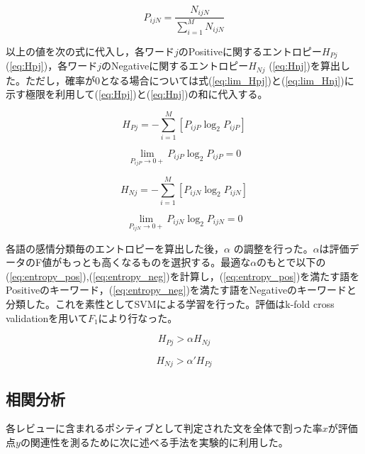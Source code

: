 \documentclass[review]{elsarticle}
\begin{document}
\begin{CJK}{UTF8}{min}
\begin{equation}\label{eq:PijN}
P_{ijN} = \frac{N_{ijN}}{\sum_{i=1}^M N_{ijN}}
\end{equation}

以上の値を次の式に代入し，各ワード\(j\)のPositiveに関するエントロピー\(H_{Pj}\) (\ref{eq:Hpj})，各ワード\(j\)のNegativeに関するエントロピー\(H_{Nj}\) (\ref{eq:Hnj})を算出した。ただし，確率が0となる場合については式(\ref{eq:lim_Hpj})と(\ref{eq:lim_Hnj})に示す極限を利用して(\ref{eq:Hpj})と(\ref{eq:Hnj})の和に代入する。

\begin{equation}\label{eq:Hpj}
H_{Pj} = - \sum_{i=1}^M [P_{ijP}\log_2 P_{ijP}]
\end{equation}

\begin{equation}\label{eq:lim_Hpj}
\lim_{P_{ijP}\to0+} P_{ijP}\log_2 P_{ijP} = 0
\end{equation}

\begin{equation}\label{eq:Hnj}
H_{Nj} = - \sum_{i=1}^M [P_{ijN}\log_2 P_{ijN}]
\end{equation}

\begin{equation}\label{eq:lim_Hnj}
\lim_{P_{ijN}\to0+} P_{ijN}\log_2 P_{ijN} = 0
\end{equation}

各語の感情分類毎のエントロピーを算出した後，\(\alpha\) の調整を行った。\(\alpha\)は評価データのF値がもっとも高くなるものを選択する。最適な\(\alpha\)のもとで以下の(\ref{eq:entropy_pos}),(\ref{eq:entropy_neg})を計算し，(\ref{eq:entropy_pos})を満たす語をPositiveのキーワード，(\ref{eq:entropy_neg})を満たす語をNegativeのキーワードと分類した。これを素性としてSVM\cite[][]{cortes1995}による学習を行った。評価はk-fold cross validationを用いて\(F_1\)\cite[][]{powers2011}により行なった。

\begin{equation}\label{eq:entropy_pos}
H_{Pj} > \alpha H_{Nj}
\end{equation}

\begin{equation}\label{eq:entropy_neg}
H_{Nj} > \alpha' H_{Pj}
\end{equation}

\subsection{相関分析}\label{correlation}

各レビューに含まれるポシティブとして判定された文を全体で割った率\(x\)が評価点\(y\)の関連性を測るために次に述べる手法を実験的に利用した。


\end{CJK}
\end{document}
